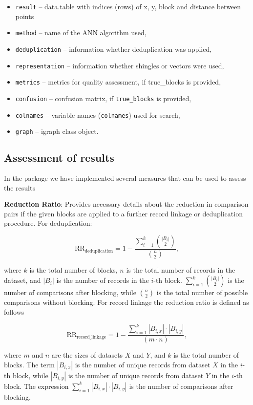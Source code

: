 \begin{itemize}
\tightlist
\item
  \texttt{result} -- data.table with indices (rows) of x, y, block and distance between points
\item
  \texttt{method} -- name of the ANN algorithm used,
\item
  \texttt{deduplication} -- information whether deduplication was applied,
\item
  \texttt{representation} -- information whether shingles or vectors were used,
\item
  \texttt{metrics} -- metrics for quality assessment, if true\_blocks is provided,
\item
  \texttt{confusion} -- confusion matrix, if \texttt{true\_blocks} is provided,
\item
  \texttt{colnames} -- variable names (\texttt{colnames}) used for search,
\item
  \texttt{graph} -- igraph class object.
\end{itemize}

\subsection{Assessment of results}\label{sec-assess}

In the package we have implemented several measures that can be used to
assess the results

\textbf{Reduction Ratio}: Provides necessary details about the reduction in
comparison pairs if the given blocks are applied to a further record
linkage or deduplication procedure. For deduplication:

\[
\text{RR}_{\text{deduplication}} = 1 - \frac{\sum\limits_{i=1}^{k} \binom{|B_i|}{2}}{\binom{n}{2}},
\]

where \(k\) is the total number of blocks, \(n\) is the total number of
records in the dataset, and \(|B_i|\) is the number of records in the
\(i\)-th block. \(\sum\limits_{i=1}^{k} \binom{|B_i|}{2}\) is the number of
comparisons after blocking, while \(\binom{n}{2}\) is the total number of
possible comparisons without blocking. For record linkage the reduction
ratio is defined as follows

\[
\text{RR}_{\text{record\_linkage}} = 1 - \frac{\sum\limits_{i=1}^{k} |B_{i,x}| \cdot |B_{i,y}|} {(m \cdot n)},
\]

where \(m\) and \(n\) are the sizes of datasets \(X\) and \(Y\), and \(k\) is the
total number of blocks. The term \(|B_{i,x}|\) is the number of unique
records from dataset \(X\) in the \(i\)-th block, while \(|B_{i,y}|\) is the
number of unique records from dataset \(Y\) in the \(i\)-th block. The
expression \(\sum\limits_{i=1}^{k} |B_{i,x}| \cdot |B_{i,y}|\) is the
number of comparisons after blocking.

